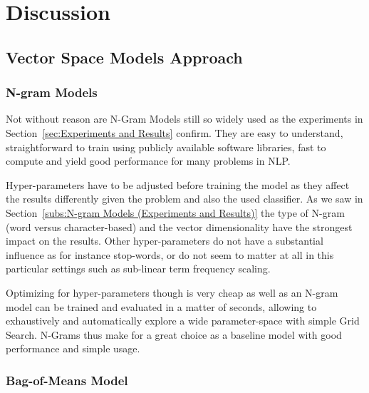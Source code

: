 
\clearpage

\section{Discussion}
\label{sec:Discussion}


\subsection{Vector Space Models Approach}
\label{sub:Vector Space Models (Discussion)}

\subsubsection{N-gram Models}

Not without reason are N-Gram Models still so widely used as the experiments in Section~\ref{sec:Experiments and Results} confirm. They are easy to understand, straightforward to train using publicly available software libraries, fast to compute and yield good performance for many problems in \gls{NLP}.

Hyper-parameters have to be adjusted before training the model as they affect the results differently given the problem and also the used classifier. As we saw in Section~\ref{subs:N-gram Models (Experiments and Results)} the type of N-gram (word versus character-based) and the vector dimensionality have the strongest impact on the results. Other hyper-parameters do not have a substantial influence as for instance stop-words, or do not seem to matter at all in this particular settings such as sub-linear term frequency scaling.

Optimizing for hyper-parameters though is very cheap as well as an N-gram model can be trained and evaluated in a matter of seconds, allowing to exhaustively and automatically explore a wide parameter-space with simple \gls{Grid Search}. N-Grams thus make for a great choice as a baseline model with good performance and simple usage.


\subsubsection{Bag-of-Means Model}
\label{Bag-of-Means Model (discussion)}


